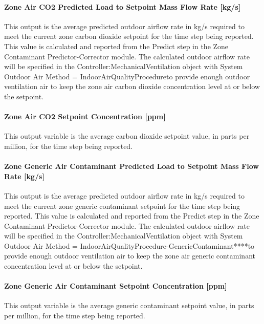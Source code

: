 \paragraph{Zone Air CO2 Predicted Load to Setpoint Mass Flow Rate {[}kg/s{]}}\label{zone-air-co2-predicted-load-to-setpoint-mass-flow-rate-kgs}

This output is the average predicted outdoor airflow rate in kg/s required to meet the current zone carbon dioxide setpoint for the time step being reported. This value is calculated and reported from the Predict step in the Zone Contaminant Predictor-Corrector module. The calculated outdoor airflow rate will be specified in the Controller:MechanicalVentilation object with System Outdoor Air Method = IndoorAirQualityProcedureto provide enough outdoor ventilation air to keep the zone air carbon dioxide concentration level at or below the setpoint.

\paragraph{Zone Air CO2 Setpoint Concentration {[}ppm{]}}\label{zone-air-co2-setpoint-concentration-ppm}

This output variable is the average carbon dioxide setpoint value, in parts per million, for the time step being reported.

\paragraph{Zone Generic Air Contaminant Predicted Load to Setpoint Mass Flow Rate {[}kg/s{]}}\label{zone-generic-air-contaminant-predicted-load-to-setpoint-mass-flow-rate-kgs}

This output is the average predicted outdoor airflow rate in kg/s required to meet the current zone generic contaminant setpoint for the time step being reported. This value is calculated and reported from the Predict step in the Zone Contaminant Predictor-Corrector module. The calculated outdoor airflow rate will be specified in the Controller:MechanicalVentilation object with System Outdoor Air Method = IndoorAirQualityProcedure-GenericContaminant****to provide enough outdoor ventilation air to keep the zone air generic contaminant concentration level at or below the setpoint.

\paragraph{Zone Generic Air Contaminant Setpoint Concentration {[}ppm{]}}\label{zone-generic-air-contaminant-setpoint-concentration-ppm}

This output variable is the average generic contaminant setpoint value, in parts per million, for the time step being reported.
